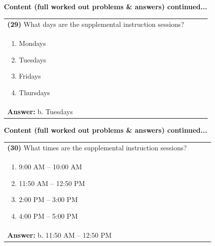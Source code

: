 \documentclass{article}
\begin{document}
{{{{{{{{\noindent
{\large\textbf{Content (full worked out problems \& answers) continued...}\\[0.2em]
\vspace{0.2cm}
\begin{tabular}{|p{0.9\linewidth}|}
\hline
\vspace{0.2cm}
\textbf{(29)} What days are the supplemental instruction sessions?\\
\begin{minipage}[t]{0.85\linewidth}
\begin{enumerate}[label=\alph*.]
   \item Mondays
   \item Tuesdays
   \item Fridays
   \item Thursdays
\end{enumerate}
\end{minipage}\\
\hline
\vspace{0.2cm}
\textbf{Answer:} b. Tuesdays\\
\hline
\end{tabular}
\newpage


\noindent
{\large\textbf{Content (full worked out problems \& answers) continued...}\\[0.2em]
\vspace{0.2cm}
\begin{tabular}{|p{0.9\linewidth}|}
\hline
\vspace{0.2cm}
\textbf{(30)} What times are the supplemental instruction sessions?\\
\begin{minipage}[t]{0.85\linewidth}
\begin{enumerate}[label=\alph*.]
   \item 9:00 AM – 10:00 AM
   \item 11:50 AM – 12:50 PM
   \item 2:00 PM – 3:00 PM
   \item 4:00 PM – 5:00 PM
\end{enumerate}
\end{minipage}\\
\hline
\vspace{0.2cm}
\textbf{Answer:} b. 11:50 AM – 12:50 PM\\
\hline
\end{tabular}
\newpage


}}}}}}}}}}
\end{document}
